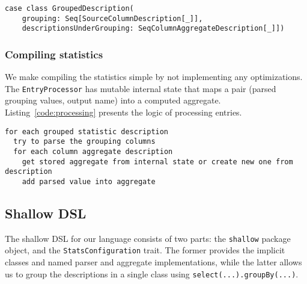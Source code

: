 \begin{lstlisting}[caption=GroupedDescription, label=code:grouped]
case class GroupedDescription(
	grouping: Seq[SourceColumnDescription[_]],
	descriptionsUnderGrouping: SeqColumnAggregateDescription[_]])
\end{lstlisting}

\subsubsection{Compiling statistics}
We make compiling the statistics simple by not implementing any optimizations. The \texttt{EntryProcessor} has mutable internal state that maps a pair (parsed grouping values, output name) into a computed aggregate. Listing~\ref{code:processing} presents the logic of processing entries.

\begin{lstlisting}[caption=Processing entries, label=code:processing]
for each grouped statistic description
  try to parse the grouping columns
  for each column aggregate description
    get stored aggregate from internal state or create new one from description
    add parsed value into aggregate
\end{lstlisting}

\subsection{Shallow DSL}

The shallow DSL for our language consists of two parts: the \texttt{shallow} package object, and the \texttt{StatsConfiguration} trait. The former provides the implicit classes and named parser and aggregate implementations, while the latter allows us to group the descriptions in a single class using \texttt{select(...).groupBy(...)}.

